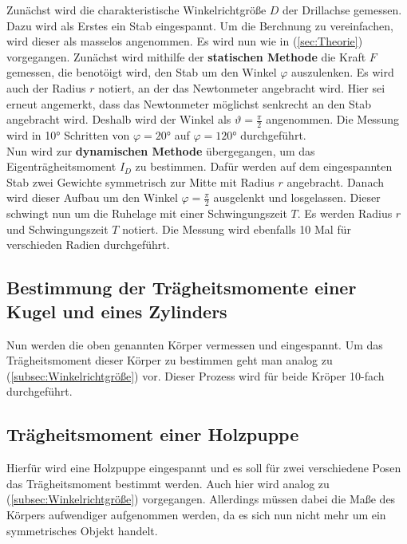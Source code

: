 Zunächst wird die charakteristische Winkelrichtgröße $D$ der Drillachse gemessen.
Dazu wird als Erstes ein Stab eingespannt.
Um die Berchnung zu vereinfachen, wird dieser als masselos angenommen.
Es wird nun wie in (\ref{sec:Theorie}) vorgegangen.
Zunächst wird mithilfe der \textbf{statischen Methode} die Kraft $F$ gemessen, die benotöigt wird,
den Stab um den Winkel $\varphi$ auszulenken.
Es wird auch der Radius $r$ notiert, an der das Newtonmeter angebracht wird.
Hier sei erneut angemerkt, dass das Newtonmeter möglichst senkrecht an den Stab angebracht wird.
Deshalb wird der Winkel als $\vartheta = \frac{\pi}{2}$ angenommen.
Die Messung wird in 10° Schritten von $\varphi = 20°$ auf $\varphi = 120°$ durchgeführt. \\

Nun wird zur \textbf{dynamischen Methode} übergegangen, um das Eigenträgheitsmoment $I_{D}$ zu bestimmen.
Dafür werden auf dem eingespannten Stab zwei Gewichte symmetrisch zur Mitte mit Radius $r$ angebracht.
Danach wird dieser Aufbau um den Winkel $\varphi = \frac{\pi}{2}$ ausgelenkt und losgelassen.
Dieser schwingt nun um die Ruhelage mit einer Schwingungszeit $T$.
Es werden Radius $r$ und Schwingungszeit $T$ notiert.
Die Messung wird ebenfalls 10 Mal für verschieden Radien durchgeführt.


\subsection{Bestimmung der Trägheitsmomente einer Kugel und eines Zylinders}
Nun werden die oben genannten Körper vermessen und eingespannt.
Um das Trägheitsmoment dieser Körper zu bestimmen geht man analog zu (\ref{subsec:Winkelrichtgröße}) vor.
Dieser Prozess wird für beide Kröper 10-fach durchgeführt.

\subsection{Trägheitsmoment einer Holzpuppe}
Hierfür wird eine Holzpuppe eingespannt und es soll für zwei verschiedene Posen das Trägheitsmoment bestimmt werden.
Auch hier wird analog zu (\ref{subsec:Winkelrichtgröße}) vorgegangen.
Allerdings müssen dabei die Maße des Körpers aufwendiger aufgenommen werden, da es sich nun nicht mehr um ein symmetrisches Objekt handelt.